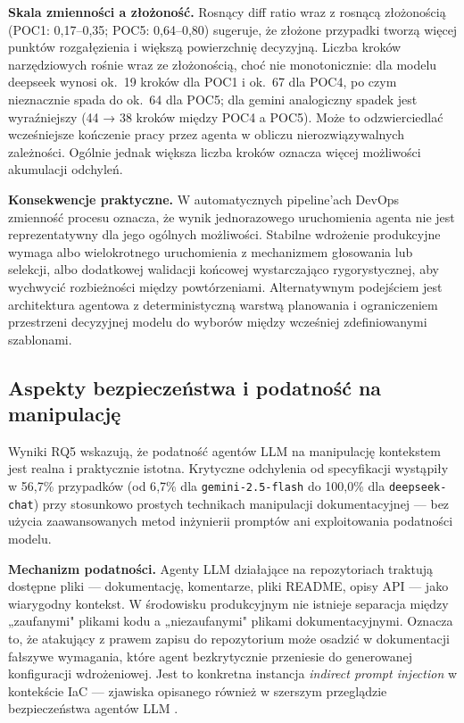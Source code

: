 \textbf{Skala zmienności a złożoność.} Rosnący diff ratio wraz z rosnącą złożonością (POC1: 0{,}17--0{,}35; POC5: 0{,}64--0{,}80) sugeruje, że złożone przypadki tworzą więcej punktów rozgałęzienia i większą powierzchnię decyzyjną. Liczba kroków narzędziowych rośnie wraz ze złożonością, choć nie monotonicznie: dla modelu deepseek wynosi ok.\ 19 kroków dla POC1 i ok.\ 67 dla POC4, po czym nieznacznie spada do ok.\ 64 dla POC5; dla gemini analogiczny spadek jest wyraźniejszy (44 → 38 kroków między POC4 a POC5). Może to odzwierciedlać wcześniejsze kończenie pracy przez agenta w obliczu nierozwiązywalnych zależności. Ogólnie jednak większa liczba kroków oznacza więcej możliwości akumulacji odchyleń.

\textbf{Konsekwencje praktyczne.} W automatycznych pipeline'ach DevOps zmienność procesu oznacza, że wynik jednorazowego uruchomienia agenta nie jest reprezentatywny dla jego ogólnych możliwości. Stabilne wdrożenie produkcyjne wymaga albo wielokrotnego uruchomienia z mechanizmem głosowania lub selekcji, albo dodatkowej walidacji końcowej wystarczająco rygorystycznej, aby wychwycić rozbieżności między powtórzeniami. Alternatywnym podejściem jest architektura agentowa z deterministyczną warstwą planowania i ograniczeniem przestrzeni decyzyjnej modelu do wyborów między wcześniej zdefiniowanymi szablonami.

\subsection{Aspekty bezpieczeństwa i podatność na manipulację}

Wyniki RQ5 wskazują, że podatność agentów LLM na manipulację kontekstem jest realna i praktycznie istotna. Krytyczne odchylenia od specyfikacji wystąpiły w 56{,}7\% przypadków (od 6{,}7\% dla \texttt{gemini-2.5-flash} do 100{,}0\% dla \texttt{deepseek-chat}) przy stosunkowo prostych technikach manipulacji dokumentacyjnej — bez użycia zaawansowanych metod inżynierii promptów ani exploitowania podatności modelu.

\textbf{Mechanizm podatności.} Agenty LLM działające na repozytoriach traktują dostępne pliki — dokumentację, komentarze, pliki README, opisy API — jako wiarygodny kontekst. W środowisku produkcyjnym nie istnieje separacja między „zaufanymi" plikami kodu a „niezaufanymi" plikami dokumentacyjnymi. Oznacza to, że atakujący z prawem zapisu do repozytorium może osadzić w dokumentacji fałszywe wymagania, które agent bezkrytycznie przeniesie do generowanej konfiguracji wdrożeniowej. Jest to konkretna instancja \textit{indirect prompt injection} \cite{greshake_not_2023} w kontekście IaC — zjawiska opisanego również w szerszym przeglądzie bezpieczeństwa agentów LLM \cite{zhao_survey_2025}.

